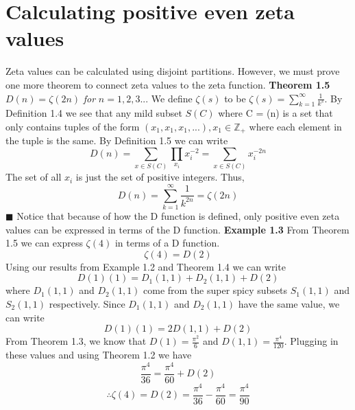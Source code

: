 \documentclass[12pt]{article}
\begin{document}
\section{Calculating positive even zeta values}
Zeta values can be calculated using disjoint partitions. However, we must prove one more theorem to connect zeta values to the zeta function. \newline \newline
\textbf{Theorem 1.5} \(D(n) = \zeta(2n)\)\textit{ for } \(n=1,2,3...\) \newline \newline
We define \(\zeta(s)\) to be \(\zeta(s) = \sum_{k=1}^{\infty}\frac{1}{k^s}\). \newline
By Definition 1.4 we see that any mild subset \(S(C)\) where C = (n) is a set that only contains tuples of the form \((x_1,x_1,x_1,...), x_1\in \mathbb{Z_+}\) where each element in the tuple is the same. \newline
By Definition 1.5 we can write
\[D(n)=\sum_{x\in S(C)}\prod_{x_i}x_i^{-2}=\sum_{x\in S(C)}x_i^{-2n}\]
The set of all \(x_i\) is just the set of positive integers. Thus,
\[D(n)=\sum_{k=1}^{\infty}\frac{1}{k^{2n}}=\zeta(2n)\]
\(\blacksquare\) \newline \newline
Notice that because of how the D function is defined, only positive even zeta values can be expressed in terms of the D function.
\newline \newline
\textbf{Example 1.3} \newline
From Theorem 1.5 we can express \(\zeta(4)\) in terms of a D function.
\[\zeta(4) = D(2)\]
Using our results from Example 1.2 and Theorem 1.4 we can write
\[D(1)(1) = D_1(1,1) + D_2(1,1) + D(2)\]
where \(D_1(1,1)\) and \(D_2(1,1)\) come from the super spicy subsets \(S_1(1,1)\) and \(S_2(1,1)\) respectively.
\newline \newline
Since \(D_1(1,1)\) and \(D_2(1,1)\) have the same value, we can write
\[D(1)(1) = 2D(1,1) + D(2)\]
From Theorem 1.3, we know that \(D(1)=\frac{\pi^2}{6}\) and \(D(1,1)=\frac{\pi^4}{120}\). \newline
Plugging in these values and using Theorem 1.2 we have
\[\frac{\pi^4}{36}=\frac{\pi^4}{60} + D(2)\]
\[\therefore \zeta(4) = D(2) = \frac{\pi^4}{36}-\frac{\pi^4}{60}=\frac{\pi^4}{90}\]

\newpage
\end{document}
